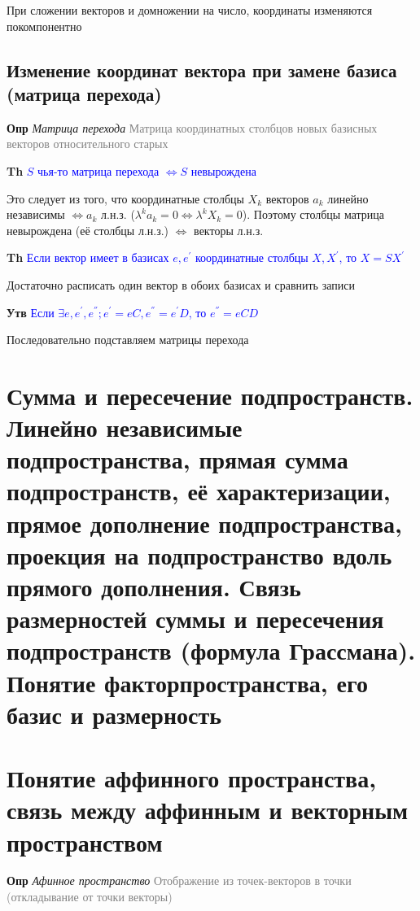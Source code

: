 \documentclass[a4paper, 14pt]{article}
\begin{document}
    При сложении векторов и домножении на число, координаты изменяются покомпонентно

    \subsection{Изменение координат вектора при замене базиса (матрица перехода)}

    \textbf{Опр} \textit{Матрица перехода} \textcolor{gray}{Матрица координатных столбцов новых базисных векторов
    относительного старых}

    \textbf{Th} \textcolor{blue}{$S$ чья-то матрица перехода $\Leftrightarrow S$ невырождена}

    Это следует из того, что координатные столбцы $X_k$ векторов $a_k$ линейно независимы $\Leftrightarrow a_k$ л.н.з.
    ($\lambda^k a_k = 0 \Leftrightarrow \lambda^k X_k = 0$).
    Поэтому столбцы матрица невырождена (её столбцы л.н.з.) $\Leftrightarrow$ векторы л.н.з.

    \textbf{Th} \textcolor{blue}{Если вектор имеет в базисах $e, e^{'}$ координатные столбцы $X, X^{'}$, то $X = SX^{'}$}

    Достаточно расписать один вектор в обоих базисах и сравнить записи

    \textbf{Утв} \textcolor{blue}{Если $\exists e, e^{'}, e^{''}; e^{'} = eC, e^{''} = e^{'}D$, то $e^{''} = eCD$}

    Последовательно подставляем матрицы перехода

    \section{Сумма и пересечение подпространств.
    Линейно независимые подпространства, прямая сумма подпространств, её характеризации, прямое дополнение
    подпространства, проекция на подпространство вдоль прямого дополнения.
    Связь размерностей суммы и пересечения подпространств (формула Грассмана).
    Понятие факторпространства, его базис и размерность}

    


    \section{Понятие аффинного пространства, связь между аффинным и векторным пространством}

    \textbf{Опр} \textit{Афинное пространство} \textcolor{gray}{Отображение из точек-векторов в точки (откладывание
    от точки векторы)}
\end{document}
